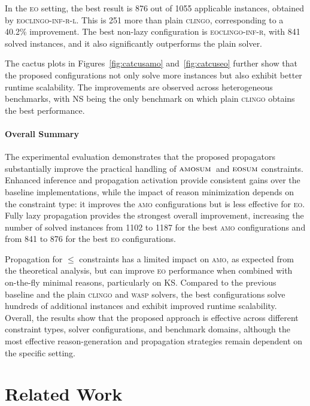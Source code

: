 \documentclass[preprint,authoryear]{elsarticle}
\newcommand{\eoclingoinfr}{\textsc{eoclingo-inf-r}\xspace}
\newcommand{\eoclingoinfrlazy}{\textsc{eoclingo-inf-r-l}\xspace}
\theoremstyle{definition}
\def\amosum{\ensuremath{\textsc{amosum}}\xspace}
\def\eosum{\ensuremath{\textsc{eosum}}\xspace}
\begin{document}
{\begin{itemize}
In the \textsc{eo} setting, the best result is 876 out of 1055 applicable instances, obtained by \eoclingoinfrlazy. This is 251 more than plain \textsc{clingo}, corresponding to a 40.2\% improvement. The best non-lazy configuration is \eoclingoinfr, with 841 solved instances, and it also significantly outperforms the plain solver.

The cactus plots in Figures~\ref{fig:catcusamo} and~\ref{fig:catcuseo} further show that the proposed configurations not only solve more instances but also exhibit better runtime scalability. The improvements are observed across heterogeneous benchmarks, with NS being the only benchmark on which plain \textsc{clingo} obtains the best performance.

\end{itemize}
}

\paragraph{Overall Summary}
{\color{blue}
The experimental evaluation demonstrates that the proposed propagators substantially improve the practical handling of \amosum\ and \eosum constraints. Enhanced inference and propagation activation provide consistent gains over the baseline implementations, while the impact of reason minimization depends on the constraint type: it improves the \textsc{amo} configurations but is less effective for \textsc{eo}. Fully lazy propagation provides the strongest overall improvement, increasing the number of solved instances from 1102 to 1187 for the best \textsc{amo} configurations and from 841 to 876 for the best \textsc{eo} configurations.

Propagation for $\le$ constraints has a limited impact on \textsc{amo}, as expected from the theoretical analysis, but can improve \textsc{eo} performance when combined with on-the-fly minimal reasons, particularly on KS. Compared to the previous baseline and the plain \textsc{clingo} and \textsc{wasp} solvers, the best configurations solve hundreds of additional instances and exhibit improved runtime scalability. Overall, the results show that the proposed approach is effective across different constraint types, solver configurations, and benchmark domains, although the most effective reason-generation and propagation strategies remain dependent on the specific setting.
}

\section{Related Work}\label{sec:rw}
\end{document}
